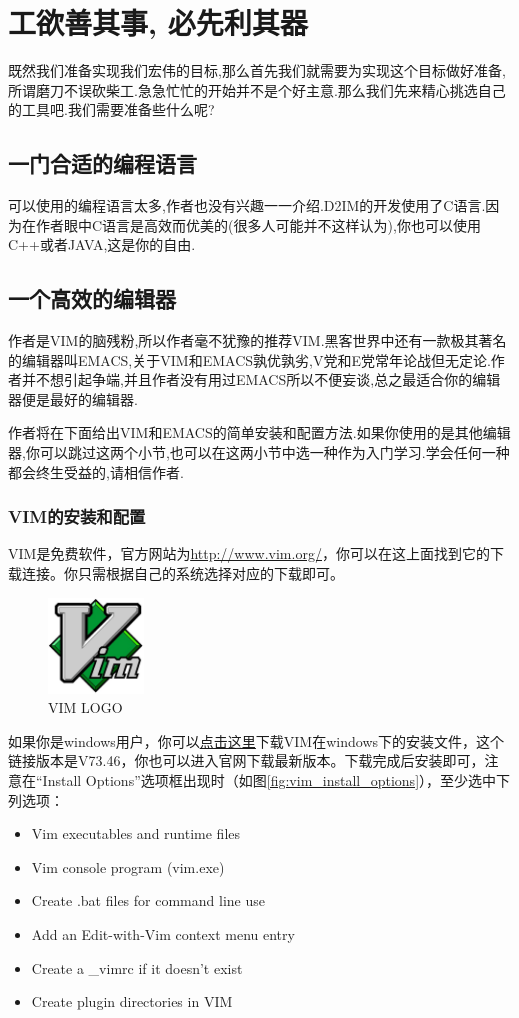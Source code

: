 \chapter{工欲善其事, 必先利其器}

既然我们准备实现我们宏伟的目标,那么首先我们就需要为实现这个目标做好准备,所谓磨刀不误砍柴工.急急忙忙的开始并不是个好主意.那么我们先来精心挑选自己的工具吧.我们需要准备些什么呢?
\section{一门合适的编程语言}
可以使用的编程语言太多,作者也没有兴趣一一介绍.D2IM的开发使用了C语言.因为在作者眼中C语言是高效而优美的(很多人可能并不这样认为),你也可以使用C++或者JAVA,这是你的自由.
\section{一个高效的编辑器}
作者是VIM的脑残粉,所以作者毫不犹豫的推荐VIM.黑客世界中还有一款极其著名的编辑器叫EMACS,关于VIM和EMACS孰优孰劣,V党和E党常年论战但无定论.作者并不想引起争端,并且作者没有用过EMACS所以不便妄谈,总之最适合你的编辑器便是最好的编辑器.

作者将在下面给出VIM和EMACS的简单安装和配置方法.如果你使用的是其他编辑器,你可以跳过这两个小节,也可以在这两小节中选一种作为入门学习.学会任何一种都会终生受益的,请相信作者.

\subsection{VIM的安装和配置}
VIM是免费软件，官方网站为\textcolor[rgb]{0.0,0.0,1.0}{\uline{\url{http://www.vim.org/}}}，你可以在这上面找到它的下载连接。你只需根据自己的系统选择对应的下载即可。
\begin{figure}[htpb]
\centering
\includegraphics[width=1in]{tools/pic/vim_logo.jpg}
\caption{VIM LOGO}
\end{figure}

如果你是windows用户，你可以\href{ftp://ftp.vim.org/pub/vim/pc/gvim73_46.exe}{\textcolor[rgb]{0.0,0.0,1.0}{\uline{点击这里}}}下载VIM在windows下的安装文件，这个链接版本是V73.46，你也可以进入官网下载最新版本。下载完成后安装即可，注意在“Install Options”选项框出现时（如图\ref{fig:vim_install_options}），至少选中下列选项：
\begin{itemize}
\item Vim executables and runtime files
\item Vim console program (vim.exe)
\item Create .bat files for command line use
\item Add an Edit-with-Vim context menu entry
\item Create a \_vimrc if it doesn't exist
\item Create plugin directories in VIM
\end{itemize}

